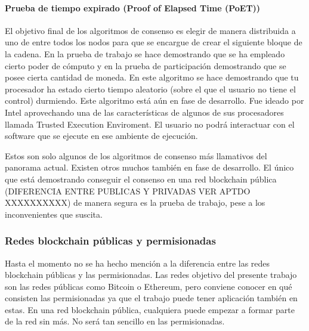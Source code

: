 \paragraph{Prueba de tiempo expirado (Proof of Elapsed Time (PoET))}
El objetivo final de los algoritmos de consenso es elegir de manera distribuida a uno de entre todos los nodos para que se encargue de crear el siguiente bloque de la cadena. En la prueba de trabajo se hace demostrando que se ha empleado cierto poder de cómputo y en la prueba de participación demostrando que se posee cierta cantidad de moneda. En este algoritmo se hace demostrando que tu procesador ha estado cierto tiempo aleatorio (sobre el que el usuario no tiene el control) durmiendo. Este algoritmo está aún en fase de desarrollo. Fue ideado por Intel aprovechando una de las características de algunos de sus procesadores llamada Trusted Execution Enviroment. El usuario no podrá interactuar con el software que se ejecute en ese ambiente de ejecución. \newline

Estos son solo algunos de los algoritmos de consenso más llamativos del panorama actual. Existen otros muchos también en fase de desarrollo. El único que está demostrando conseguir el consenso en una red blockchain pública (DIFERENCIA ENTRE PUBLICAS Y PRIVADAS VER APTDO XXXXXXXXXX) de manera segura es la prueba de trabajo, pese a los inconvenientes que suscita.

\subsubsection{Redes blockchain públicas y permisionadas}
Hasta el momento no se ha hecho mención a la diferencia entre las redes blockchain públicas y las permisionadas. Las redes objetivo del presente trabajo son las redes públicas como Bitcoin o Ethereum, pero conviene conocer en qué consisten las permisionadas ya que el trabajo puede tener aplicación también en estas. En una red blockchain pública, cualquiera puede empezar a formar parte de la red sin más. No será tan sencillo en las permisionadas. \newline

